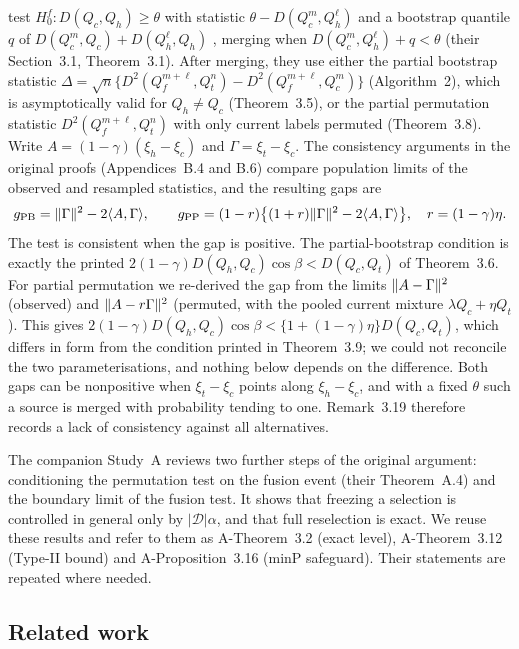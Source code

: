 \documentclass[11pt,a4paper]{article}
\begin{document}
\citet{yang2026} test $H_0^f:D(Q_c,Q_h)\ge\theta$ with statistic $\theta-D(Q_c^m,Q_h^\ell)$ and a bootstrap quantile $q$ of $D(Q_c^m,Q_c)+D(Q_h^\ell,Q_h)$ \citep[Section 4.2]{liugandy2026}, merging when $D(Q_c^m,Q_h^\ell)+q<\theta$ (their Section~3.1, Theorem~3.1). After merging, they use either the partial bootstrap statistic $\Delta=\sqrt n\{D^2(Q_f^{m+\ell},Q_t^n)-D^2(Q_f^{m+\ell},Q_c^m)\}$ (Algorithm~2), which is asymptotically valid for $Q_h\neq Q_c$ (Theorem~3.5), or the partial permutation statistic $D^2(Q_f^{m+\ell},Q_t^n)$ with only current labels permuted (Theorem~3.8). Write $A=(1-\gamma)(\xi_h-\xi_c)$ and $\Gamma=\xi_t-\xi_c$. The consistency arguments in the original proofs (Appendices~B.4 and B.6) compare population limits of the observed and resampled statistics, and the resulting gaps are
\[
g_{\rm PB}=\lVert \Gamma\rVert^2-2\langle A, \Gamma\rangle,
\qquad
g_{\rm PP}=(1-r)\big\{(1+r)\lVert \Gamma\rVert^2-2\langle A, \Gamma\rangle\big\},\quad r=(1-\gamma)\eta .
\]
The test is consistent when the gap is positive. The partial-bootstrap condition is exactly the printed $2(1-\gamma)D(Q_h,Q_c)\cos\beta<D(Q_c,Q_t)$ of Theorem~3.6. For partial permutation we re-derived the gap from the limits $\lVert A-\Gamma\rVert^2$ (observed) and $\lVert A-r\Gamma\rVert^2$ (permuted, with the pooled current mixture $\lambda Q_c+\eta Q_t$). This gives $2(1-\gamma)D(Q_h,Q_c)\cos\beta<\{1+(1-\gamma)\eta\}D(Q_c,Q_t)$, which differs in form from the condition printed in Theorem~3.9; we could not reconcile the two parameterisations, and nothing below depends on the difference. Both gaps can be nonpositive when $\xi_t-\xi_c$ points along $\xi_h-\xi_c$, and with a fixed $\theta$ such a source is merged with probability tending to one. Remark~3.19 therefore records a lack of consistency against all alternatives.

The companion Study~A reviews two further steps of the original argument: conditioning the permutation test on the fusion event (their Theorem~A.4) and the boundary limit of the fusion test. It shows that freezing a selection is controlled in general only by $|\mathcal D|\alpha$, and that full reselection is exact. We reuse these results and refer to them as A-Theorem~3.2 (exact level), A-Theorem~3.12 (Type-II bound) and A-Proposition~3.16 (minP safeguard). Their statements are repeated where needed.

\subsection{Related work}\label{sec:related}
\end{document}
